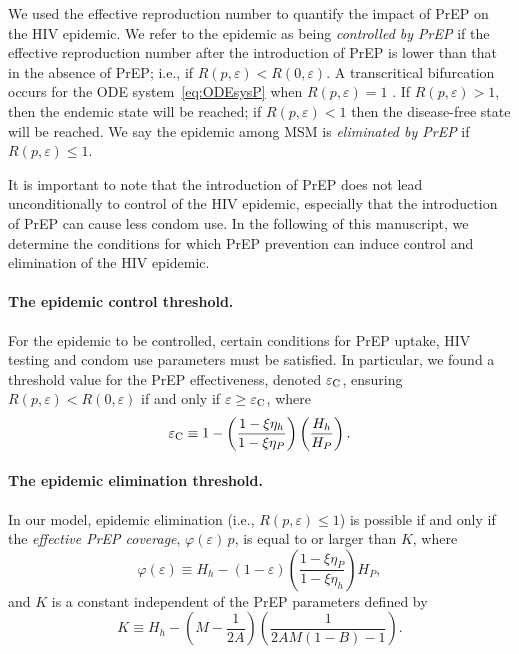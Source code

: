 \documentclass[12pt]{article}
\begin{document}
We used the effective reproduction number to quantify the impact of PrEP on the HIV epidemic. We refer to the epidemic as being {\it controlled by PrEP} if the effective reproduction number after the introduction of PrEP is lower than that in the absence of PrEP; i.e., if $R(p,\varepsilon) < R(0,\varepsilon)$. A transcritical bifurcation occurs for the ODE system~\eqref{eq:ODEsysP} when $R(p,\varepsilon)=1$ \cite{Jacquez1988,VanDenDriessche2008}. If $R(p,\varepsilon)>1$, then the endemic state will be reached; if $R(p,\varepsilon) < 1$ then the disease-free state will be reached. We say the epidemic among MSM is {\it eliminated by PrEP} if $R(p,\varepsilon) \leq 1$. 

It is important to note that the introduction of PrEP does not lead unconditionally to control of the HIV epidemic, especially that the introduction of PrEP can cause less condom use. In the following of this manuscript, we determine the conditions for which PrEP prevention can induce control and elimination of the HIV epidemic.


\paragraph{The epidemic control threshold.} 

For the epidemic to be controlled, certain conditions for PrEP uptake, HIV testing and condom use parameters must be satisfied. In particular, we found a threshold value for the PrEP effectiveness, denoted $\varepsilon_{\rm C}$, ensuring $R(p,\varepsilon) < R(0,\varepsilon)$ if and only if $\varepsilon \geq \varepsilon_{\rm C}$, where
\begin{equation}
	\varepsilon_{\rm C}\equiv 1 - \left( \frac{1-\xi \eta_h}{1-\xi \eta_P}\right) \left(\frac{H_h}{H_P}\right).
\end{equation}


\paragraph{The epidemic elimination threshold.} 

In our model, epidemic elimination (i.e., $R(p,\varepsilon) \leq 1$) is possible if and only if the {\it effective PrEP coverage}, $\varphi(\varepsilon) \, p$, is equal to or larger than $K$, where 
\begin{equation}
	\varphi(\varepsilon) \equiv H_h - (1-\varepsilon) \left( \frac{1-\xi \eta_P}{1-\xi \eta_h}\right) H_P,
\end{equation} 
and $K$ is a constant independent of the PrEP parameters defined by
\begin{equation}
	K \equiv H_h - \left(M - \frac{1}{2A}\right) \left(\frac{1}{2AM (1-B) -1}\right).
\end{equation}
\end{document}
